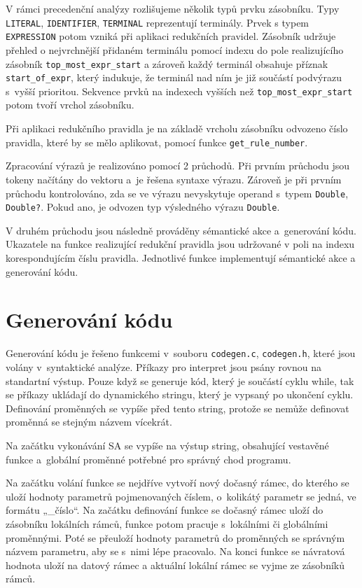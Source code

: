 \documentclass[11pt]{article}
\begin{document}
V rámci precedenční analýzy rozlišujeme několik typů prvku zásobníku. Typy \texttt{LITERAL}, \texttt{IDENTIFIER}, \texttt{TERMINAL} reprezentují terminály.
Prvek s typem \texttt{EXPRESSION} potom vzniká při aplikaci redukčních pravidel.
Zásobník udržuje přehled o nejvrchnější přidaném terminálu pomocí indexu do pole realizujícího zásobník \texttt{top\_most\_expr\_start}
a zároveň každý terminál obsahuje příznak \texttt{start\_of\_expr}, který indukuje, že terminál nad ním je již součástí podvýrazu s~vyšší prioritou.
Sekvence prvků na indexech vyšších než \texttt{top\_most\_expr\_start} potom tvoří vrchol zásobníku.

Při aplikaci redukčního pravidla je na základě vrcholu zásobníku odvozeno číslo pravidla, které by se mělo aplikovat, pomocí funkce \texttt{get\_rule\_number}.


Zpracování výrazů je realizováno pomocí 2 průchodů. Při prvním průchodu jsou tokeny načítány do vektoru a~je řešena syntaxe výrazu.
Zároveň je při prvním průchodu kontrolováno, zda se ve výrazu nevyskytuje operand s~typem \texttt{Double}, \texttt{Double?}. Pokud
ano, je odvozen typ výsledného výrazu \texttt{Double}.

V druhém průchodu jsou následně prováděny sémantické akce a~generování kódu.
Ukazatele na funkce realizující redukční pravidla jsou udržované v poli na indexu korespondujícím
číslu pravidla. Jednotlivé funkce implementují sémantické akce a generování kódu.












\section{Generování kódu}
Generování kódu je řešeno funkcemi v~souboru \texttt{codegen.c},  \texttt{codegen.h},
které jsou volány v~syntaktické analýze.
Příkazy pro interpret jsou psány rovnou na standartní výstup.
Pouze když se generuje kód, který je součástí cyklu while, tak se příkazy ukládají
do dynamického stringu, který je vypsaný po ukončení cyklu.
Definování proměnných se vypíše před tento string, protože se nemůže definovat proměnná se stejným názvem vícekrát.

Na začátku vykonávání SA se vypíše na výstup string, obsahující vestavěné funkce a~globální proměnné potřebné pro správný chod programu.

Na začátku volání funkce se nejdříve vytvoří nový dočasný rámec, do kterého se uloží hodnoty parametrů pojmenovaných číslem,
o~kolikátý parametr se jedná, ve formátu „\_číslo“. Na začátku definování funkce se dočasný rámec uloží do zásobníku
lokálních rámců, funkce potom pracuje s~lokálními či globálními proměnnými.
Poté se přeuloží hodnoty parametrů do proměnných se správným názvem parametru, aby se s~nimi lépe pracovalo.
Na konci funkce se návratová hodnota uloží na datový rámec a aktuální lokální rámec se vyjme ze zásobníků rámců.
\end{document}
